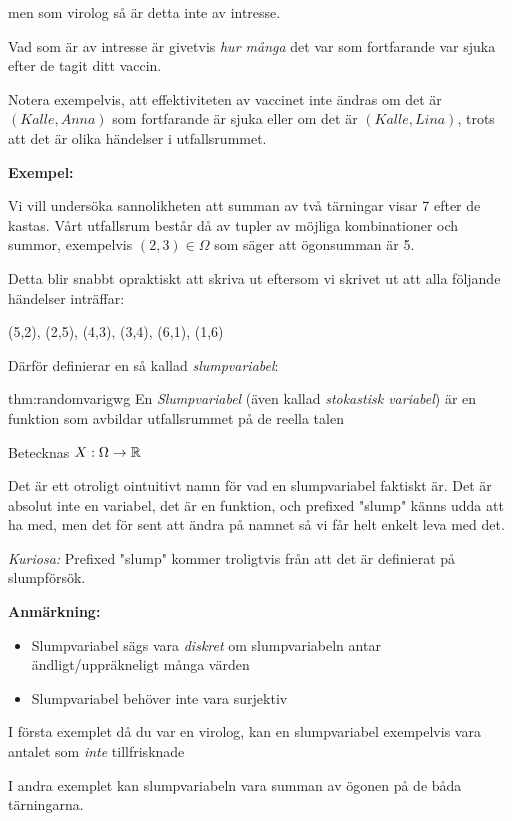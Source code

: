 \noindent men som virolog så är detta inte av intresse.\par
\noindent Vad som är av intresse är givetvis \textit{hur många} det var som fortfarande var sjuka efter de tagit ditt vaccin.\par
\noindent Notera exempelvis, att effektiviteten av vaccinet inte ändras om det är $(Kalle, Anna)$ som fortfarande är sjuka eller om det är $(Kalle, Lina)$, trots att det är olika händelser i utfallsrummet. 
\par\bigskip
\noindent\textbf{Exempel:}\par
\noindent Vi vill undersöka sannolikheten att summan av två tärningar visar 7 efter de kastas. Vårt utfallsrum består då av tupler av möjliga kombinationer och summor, exempelvis $(2,3)\in\Omega$ som säger att ögonsumman är 5.\par
\noindent Detta blir snabbt opraktiskt att skriva ut eftersom vi skrivet ut att alla följande händelser inträffar:\par(5,2), (2,5), (4,3), (3,4), (6,1), (1,6)
\par\bigskip
\noindent Därför definierar en så kallad \textit{slumpvariabel}:
\par\bigskip
\begin{theo}[Slumpvariabel]{thm:randomvarigwg}
  En \textit{Slumpvariabel} (även kallad \textit{stokastisk variabel}) är en funktion som avbildar utfallsrummet på de reella talen
  \par\bigskip
  \noindent Betecknas $X:\Omega\to\mathbb{R}$
\end{theo}
\par\bigskip
\noindent Det är ett otroligt ointuitivt namn för vad en slumpvariabel faktiskt är. Det är absolut inte en variabel, det är en funktion, och prefixed "slump" känns udda att ha med, men det för sent att ändra på namnet så vi får helt enkelt leva med det.\par
\noindent\textit{Kuriosa:} Prefixed "slump" kommer troligtvis från att det är definierat på slumpförsök. 
\par\bigskip
\noindent\textbf{Anmärkning:}\par
\begin{itemize}
  \item Slumpvariabel sägs vara \textit{diskret} om slumpvariabeln antar ändligt/uppräkneligt många värden
  \item Slumpvariabel behöver inte vara surjektiv 
\end{itemize}
\par\bigskip
\noindent I första exemplet då du var en virolog, kan en slumpvariabel exempelvis vara antalet som \textit{inte} tillfrisknade\par
\noindent I andra exemplet kan slumpvariabeln vara summan av ögonen på de båda tärningarna.
\par\bigskip
